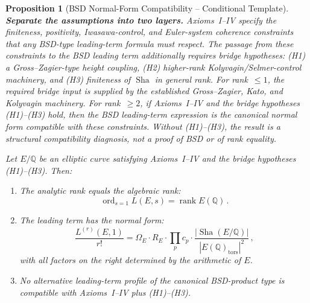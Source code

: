 \documentclass[aps,prd,twocolumn,superscriptaddress,nofootinbib,floatfix]{revtex4-2}
\newtheorem{proposition}[theorem]{Proposition}
\theoremstyle{definition}
\theoremstyle{remark}
\DeclareMathOperator{\ord}{ord}
\DeclareMathOperator{\rank}{rank}
\DeclareMathOperator{\Sha}{Sha}
\begin{document}
\begin{proposition}[BSD Normal-Form Compatibility -- Conditional Template]
\label{thm:bsd_normal}
\textbf{Separate the assumptions into two layers.} Axioms~I--IV specify the
finiteness, positivity, Iwasawa-control, and Euler-system coherence constraints
that any BSD-type leading-term formula must respect. The passage from these
constraints to the BSD leading term additionally requires bridge hypotheses:
(H1) a Gross--Zagier-type height coupling, (H2) higher-rank
Kolyvagin/Selmer-control machinery, and (H3) finiteness of $\Sha$ in general
rank. For rank~$\leq 1$, the required bridge input is supplied by the
established Gross--Zagier, Kato, and Kolyvagin machinery. For rank~$\geq 2$,
if Axioms~I--IV and the bridge hypotheses (H1)--(H3) hold, then the BSD
leading-term expression is the canonical normal form compatible with these
constraints. Without (H1)--(H3), the result is a structural compatibility
diagnosis, not a proof of BSD or of rank equality.

Let $E/\mathbb{Q}$ be an elliptic curve satisfying Axioms~I--IV and the bridge hypotheses (H1)--(H3). Then:
\begin{enumerate}
\item The analytic rank equals the algebraic rank:
\begin{equation}
\ord_{s=1} L(E,s) = \rank E(\mathbb{Q})\,.
\end{equation}
\item The leading term has the normal form:
\begin{equation}
\frac{L^{(r)}(E,1)}{r!} = \Omega_E \cdot R_E \cdot \prod_p c_p \cdot \frac{|\Sha(E/\mathbb{Q})|}{|E(\mathbb{Q})_{\mathrm{tors}}|^2}\,,
\end{equation}
with all factors on the right determined by the arithmetic of $E$.
\item No alternative leading-term profile of the canonical BSD-product type is compatible with Axioms~I--IV plus (H1)--(H3).
\end{enumerate}
\end{proposition}
\end{document}

